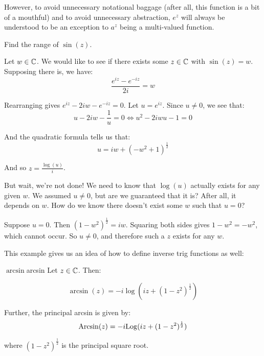 However, to avoid unnecessary notational baggage (after all, this function is a bit of a mouthful) and to avoid unnecessary abstraction, $e^z$ will always be understood to be an exception to $a^z$ being a multi-valued function.

\begin{ex}{}{} Find the range of $\sin(z)$.

Let $w\in \mathbb{C}$. We would like to see if there exists some $z\in\mathbb{C}$ with $\sin(z) = w$. Supposing there is, we have:
$$\frac{e^{iz} - e^{-iz}}{2i} = w$$

Rearranging gives $e^{iz} - 2iw - e^{-iz} = 0$. Let $u = e^{iz}$. Since $u\ne 0$, we see that:
$$u - 2iw - \frac{1}{u} = 0 \iff u^2 - 2iwu - 1 = 0$$

And the quadratic formula tells us that:
$$u = iw + (-w^2 + 1)^{\frac{1}{2}}$$

And so $z = \frac{\log(u)}{i}$.

But wait, we're not done! We need to know that $\log(u)$ actually exists for any given $w$. We assumed $u\ne 0$, but are we guaranteed that it is? After all, it depends on $w$. How do we know there doesn't exist some $w$ such that $u = 0$?

Suppose $u = 0$. Then $(1 - w^2)^{\frac{1}{2}} = iw$. Squaring both sides gives $1 - w^2 = -w^2$, which cannot occur. So $u\ne 0$, and therefore such a $z$ exists for any $w$.
\end{ex}

This example gives us an idea of how to define inverse trig functions as well:

\begin{defbo}{$\arcsin$}{arcsin} Let $z\in \mathbb{C}$. Then:

$$\arcsin(z) = -i\log(iz + (1 - z^2)^{\frac{1}{2}})$$

Further, the principal arcsin is given by:
$$\mathrm{Arcsin}(z) = -i\mathrm{Log}(iz + (1-z^2)^{\frac{1}{2}})$$

\noin where $(1 - z^2)^{\frac{1}{2}}$ is the principal square root.
\end{defbo}
